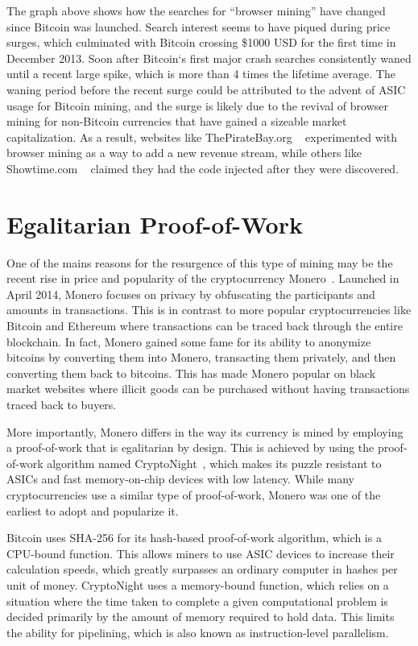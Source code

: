 The graph above shows how the searches for ``browser mining'' have changed since Bitcoin was launched. Search interest seems to have piqued during price surges, which culminated with Bitcoin crossing \$1000 USD for the first time in December 2013. Soon after Bitcoin`s first major crash searches consistently waned until a recent large spike, which is more than 4 times the lifetime average. The waning period before the recent surge could be attributed to the advent of ASIC usage for Bitcoin mining, and the surge is likely due to the revival of browser mining for non-Bitcoin currencies that have gained a sizeable market capitalization. As a result, websites like ThePirateBay.org ~\cite{piratesbayhive} experimented with browser mining as a way to add a new revenue stream, while others like Showtime.com ~\cite{showtimehive} claimed they had the code injected after they were discovered.

\section{Egalitarian Proof-of-Work}
One of the mains reasons for the resurgence of this type of mining may be the recent rise in price and popularity of the cryptocurrency Monero~\cite{monero}. Launched in April 2014, Monero focuses on privacy by obfuscating the participants and amounts in transactions. This is in contrast to more popular cryptocurrencies like Bitcoin and Ethereum where transactions can be traced back through the entire blockchain. In fact, Monero gained some fame for its ability to anonymize bitcoins by converting them into Monero, transacting them privately, and then converting them back to bitcoins. This has made Monero popular on black market websites where illicit goods can be purchased without having transactions traced back to buyers. 


More importantly, Monero differs in the way its currency is mined by employing a proof-of-work that is egalitarian by design. This is achieved by using the proof-of-work algorithm named CryptoNight~\cite{cryptoknight}, which makes its puzzle resistant to ASICs and fast memory-on-chip devices with low latency. While many cryptocurrencies use a similar type of proof-of-work, Monero was one of the earliest to adopt and popularize it. 


Bitcoin uses SHA-256 for its hash-based proof-of-work algorithm, which is a CPU-bound function. This allows miners to use ASIC devices to increase their calculation speeds, which greatly surpasses an ordinary computer in hashes per unit of money. CryptoNight uses a memory-bound function, which relies on a situation where the time taken to complete a given computational problem is decided primarily by the amount of memory required to hold data. This limits the ability for pipelining, which is also known as instruction-level parallelism.  


